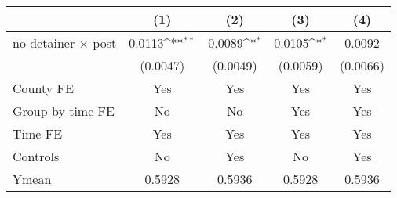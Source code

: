 {
\def\sym#1{\ifmmode^{#1}\else\(^{#1}\)\fi}
\begin{tabular}{l*{4}{c}}
\hline\hline
                    &\multicolumn{1}{c}{(1)}         &\multicolumn{1}{c}{(2)}         &\multicolumn{1}{c}{(3)}         &\multicolumn{1}{c}{(4)}         \\
\hline
no-detainer $\times$ post&      0.0113\sym{**} &      0.0089\sym{*}  &      0.0105\sym{*}  &      0.0092         \\
                    &    (0.0047)         &    (0.0049)         &    (0.0059)         &    (0.0066)         \\
[1em]
County FE           &         Yes         &         Yes         &         Yes         &         Yes         \\
[1em]
Group-by-time FE    &          No         &          No         &         Yes         &         Yes         \\
[1em]
Time FE             &         Yes         &         Yes         &         Yes         &         Yes         \\
[1em]
Controls            &          No         &         Yes         &          No         &         Yes         \\
\hline
Ymean               &      0.5928         &      0.5936         &      0.5928         &      0.5936         \\
\hline\hline
\end{tabular}
}
